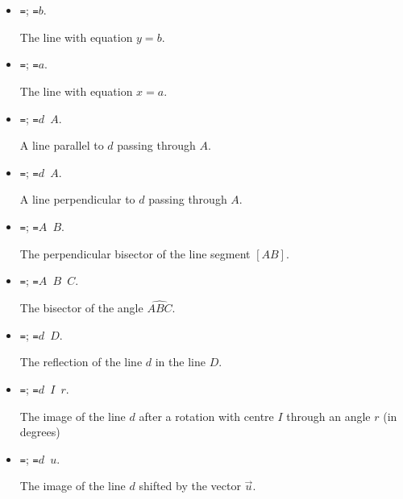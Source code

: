 \begin{itemize}

\item \texttt{=};
\texttt{=$b$}.

The line with equation $y=b$.

\item \texttt{=};
\texttt{=$a$}.

The line with equation $x=a$.

\item \texttt{=};
\texttt{=$d$ $A$}.

A line parallel to $d$ passing through
$A$.

\item \texttt{=};
\texttt{=$d$ $A$}.

A line perpendicular to $d$ passing
through $A$.

\item \texttt{=};
\texttt{=$A$ $B$}.

The perpendicular bisector of the line
segment $[AB]$.

\item \texttt{=};
\texttt{=$A$ $B$ $C$}.

The bisector of the angle $\widehat
{ABC}$.

\item \texttt{=};
\texttt{=$d$ $D$}.

The reflection of the line $d$ in the
line $D$.

\item \texttt{=};
\texttt{=$d$ $I$ $r$}.

The image of the line $d$ after a
rotation with centre $I$ through an angle $r$ (in degrees)

\item \texttt{=};
\texttt{=$d$ $u$}.

The image of the line $d$ shifted by the vector $\vec u$.

\end{itemize}

\endinput
